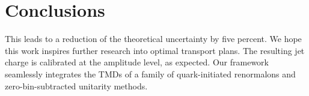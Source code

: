 \section{Conclusions}\label{sec:conclusions}

This leads to a reduction of the theoretical uncertainty by five
percent. We hope this work inspires further research into optimal
transport plans. The resulting jet charge is calibrated at the amplitude
level, as expected. Our framework seamlessly integrates the TMDs of a
family of quark-initiated renormalons and zero-bin-subtracted unitarity
methods.

